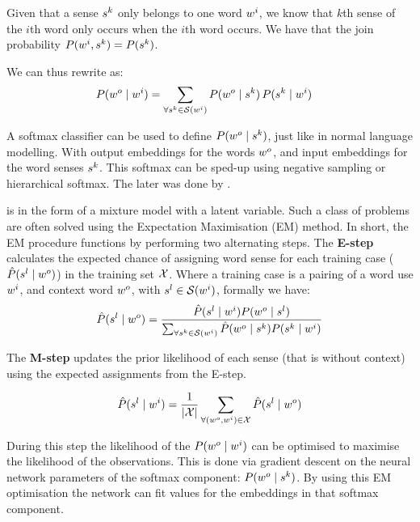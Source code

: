 \documentclass[12pt,parskip]{komatufte}
\begin{document}
Given that a sense $\n s_k$ only belongs to one word $\n w_i$,
we know that $k$th sense of the $i$th word only occurs when the $i$th word occurs.
We have that the join probability $P(\n w_i,\n s_k) = P(\n s_k)$.

We can thus rewrite  as:
\begin{align}
P(\n w_o\mid \n w_i) &= \sum_{\forall \n s_k \in \seq S(\n w_i)} P(\n w_o \mid \n s_k) \, P(\n s_k \mid \n w_i) \label{equ:tianmm2}
\end{align}

A softmax classifier can be used to define $P(\n w_o \mid \n s_k)$, just like in normal language modelling.
With output embeddings for the words $\n w_o$, and input embeddings for the word senses $\n s_k$.
This softmax can be sped-up using negative sampling or hierarchical softmax.
The later was done by \textcite{tian2014probabilistic}.

 is in the form of a mixture model with a latent variable.
Such a class of problems are often solved using the Expectation Maximisation (EM) method.
In short, the EM procedure functions by performing two alternating steps.
The \textbf{E-step} calculates the expected chance of assigning word sense for each training case ($\hat{P}(\n s_l \mid \n w_o)$) in the training set $\mathcal{X}$.
Where a training case is a pairing of a word use $\n w_i$, and context word $\n w_o$, with $\n s_l\in \seq S(\n w_i)$, formally we have:
\begin{align}
\hat{P}(\n s_l \mid \n w_o) = \frac{\hat{P}(\n s_l \mid \n w_i) P(\n w_o \mid \n s_l)}{\sum_{\forall \n s_k \in \seq S(\n w_i)} \hat{P}(\n w_o \mid \n s_k) P(\n s_k \mid \n w_i)}
\end{align}

The \textbf{M-step} updates the prior likelihood of each sense (that is without context) using the expected assignments from the E-step.

\begin{align}
\hat{P}(\n s_l \mid \n w_i) = \frac{1}{\left|\seq X\right|} \sum_{\forall (\n w_o,\n w_i)\in \seq X} \hat{P}(\n s_l \mid \n w_o)
\end{align}

During this step the likelihood of the $P(\n w_o \mid \n w_i)$ can be optimised to maximise the likelihood of the observations.
This is done via gradient descent on the neural network parameters of the softmax component: \mbox{$P(\n w_o \mid \n s_k)$}.
By using this EM optimisation the network can fit values for the embeddings in that softmax component.
\end{document}
